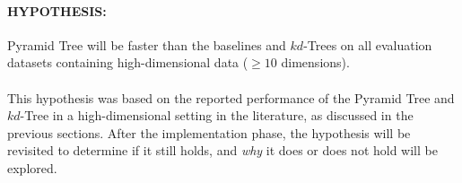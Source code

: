\paragraph{\textbf{HYPOTHESIS:}} Pyramid Tree will be faster than the baselines and $kd$-Trees on all evaluation datasets containing high-dimensional data ($\geq 10$ dimensions).

\paragraph{}

This hypothesis was based on the reported performance of the Pyramid Tree and $kd$-Tree in a high-dimensional setting in the literature, as discussed in the previous sections. After the implementation phase, the hypothesis will be revisited to determine if it still holds, and \textit{why} it does or does not hold will be explored.